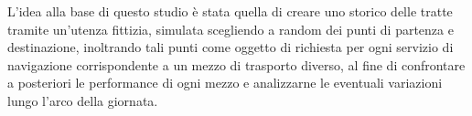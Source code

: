 \cite{croci2014}

\cite{rotaris2010}

\cite{rotaris2019}

\cite{meinardi2008}


L'idea alla base di questo studio è stata quella di creare uno storico delle tratte tramite un'utenza fittizia, simulata scegliendo a random dei punti di partenza e destinazione, inoltrando tali punti come oggetto di richiesta per ogni servizio di navigazione corrispondente a un mezzo di trasporto diverso, al fine di confrontare a posteriori le performance di ogni mezzo e analizzarne le eventuali variazioni lungo l'arco della giornata.

